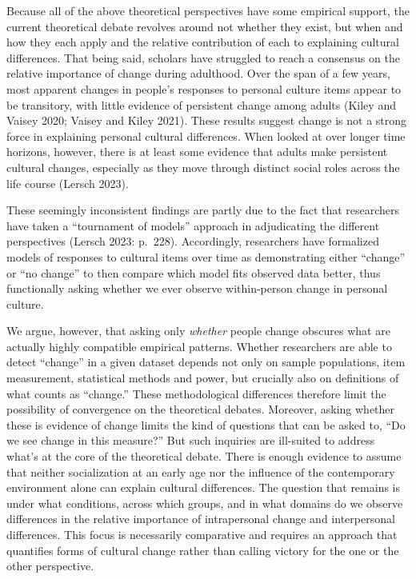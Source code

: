 \documentclass[
  11pt,
]{article}
\begin{document}
Because all of the above theoretical perspectives have some empirical
support, the current theoretical debate revolves around not whether they
exist, but when and how they each apply and the relative contribution of
each to explaining cultural differences. That being said, scholars have
struggled to reach a consensus on the relative importance of change
during adulthood. Over the span of a few years, most apparent changes in
people's responses to personal culture items appear to be transitory,
with little evidence of persistent change among adults (Kiley and Vaisey
2020; Vaisey and Kiley 2021). These results suggest change is not a
strong force in explaining personal cultural differences. When looked at
over longer time horizons, however, there is at least some evidence that
adults make persistent cultural changes, especially as they move through
distinct social roles across the life course (Lersch 2023).

These seemingly inconsistent findings are partly due to the fact that
researchers have taken a ``tournament of models'' approach in
adjudicating the different perspectives (Lersch 2023: p.~228).
Accordingly, researchers have formalized models of responses to cultural
items over time as demonstrating either ``change'' or ``no change'' to
then compare which model fits observed data better, thus functionally
asking whether we ever observe within-person change in personal culture.

We argue, however, that asking only \emph{whether} people change
obscures what are actually highly compatible empirical patterns. Whether
researchers are able to detect ``change'' in a given dataset depends not
only on sample populations, item measurement, statistical methods and
power, but crucially also on definitions of what counts as ``change.''
These methodological differences therefore limit the possibility of
convergence on the theoretical debates. Moreover, asking whether these
is evidence of change limits the kind of questions that can be asked to,
``Do we see change in this measure?'' But such inquiries are ill-suited
to address what's at the core of the theoretical debate. There is enough
evidence to assume that neither socialization at an early age nor the
influence of the contemporary environment alone can explain cultural
differences. The question that remains is under what conditions, across
which groups, and in what domains do we observe differences in the
relative importance of intrapersonal change and interpersonal
differences. This focus is necessarily comparative and requires an
approach that quantifies forms of cultural change rather than calling
victory for the one or the other perspective.
\end{document}
